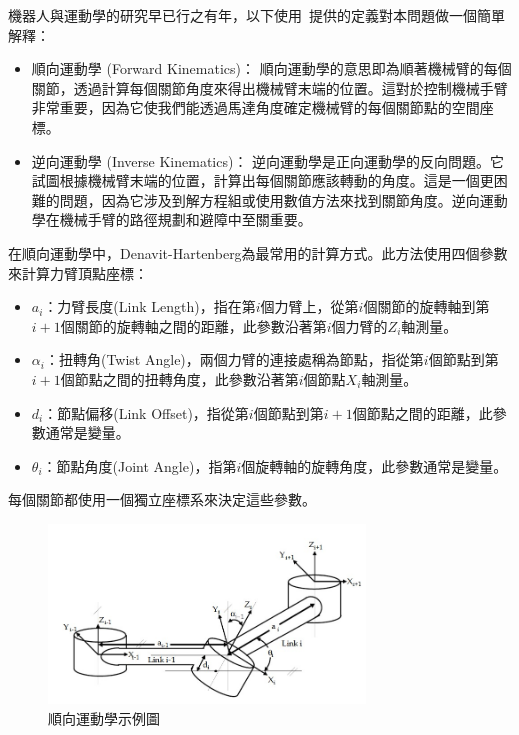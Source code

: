 \documentclass[class=NCU_thesis, crop=false]{standalone}
\begin{document}
機器人與運動學的研究早已行之有年，以下使用~\cite{kucuk2006robot}提供的定義對本問題做一個簡單解釋：
\begin{itemize}
    \item 順向運動學 (Forward Kinematics)： 順向運動學的意思即為順著機械臂的每個關節，透過計算每個關節角度來得出機械臂末端的位置。這對於控制機械手臂非常重要，因為它使我們能透過馬達角度確定機械臂的每個關節點的空間座標。

    \item 逆向運動學 (Inverse Kinematics)： 逆向運動學是正向運動學的反向問題。它試圖根據機械臂末端的位置，計算出每個關節應該轉動的角度。這是一個更困難的問題，因為它涉及到解方程組或使用數值方法來找到關節角度。逆向運動學在機械手臂的路徑規劃和避障中至關重要。
\end{itemize}

在順向運動學中，Denavit-Hartenberg為最常用的計算方式。此方法使用四個參數來計算力臂頂點座標： 
\begin{itemize}
    \item $a_{i}$：力臂長度(Link Length)，指在第$i$個力臂上，從第$i$個關節的旋轉軸到第$i+1$個關節的旋轉軸之間的距離，此參數沿著第$i$個力臂的$Z_{i}$軸測量。
    \item $\alpha_{i}$：扭轉角(Twist Angle)，兩個力臂的連接處稱為節點，指從第$i$個節點到第$i+1$個節點之間的扭轉角度，此參數沿著第$i$個節點$X_{i}$軸測量。
    \item $d_{i}$：節點偏移(Link Offset)，指從第$i$個節點到第$i+1$個節點之間的距離，此參數通常是變量。
    \item $\theta_{i}$：節點角度(Joint Angle)，指第$i$個旋轉軸的旋轉角度，此參數通常是變量。
\end{itemize}
每個關節都使用一個獨立座標系來決定這些參數。

\begin{figure}[htbp]
    \centering
    \includegraphics[width=0.75\textwidth]{figures/Coordinate frame assignment for a general manipulator.jpg}
\caption{順向運動學示例圖~\cite{kucuk2006robot}}
\end{figure}
\end{document}
